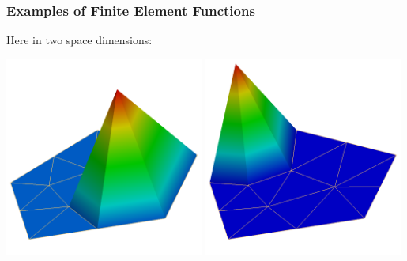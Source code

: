 \documentclass[ignorenonframetext,11pt]{beamer}
\theoremstyle{definition}
\begin{document}
\begin{frame}
\frametitle{Examples of Finite Element Functions}
Here in two space dimensions:
\begin{center}
\includegraphics[width=0.49\textwidth]{p1_1}
\includegraphics[width=0.49\textwidth]{p1_2}
\end{center}
\end{frame}
\end{document}
